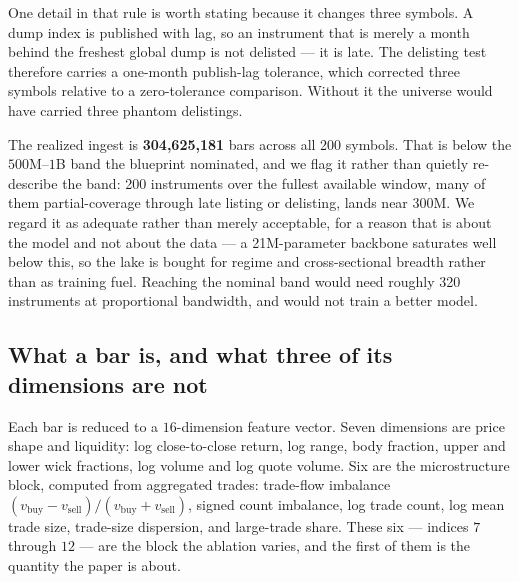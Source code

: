 One detail in that rule is worth stating because it changes three symbols. A dump index is published
with lag, so an instrument that is merely a month behind the freshest global dump is not delisted ---
it is late. The delisting test therefore carries a one-month publish-lag tolerance, which corrected
three symbols relative to a zero-tolerance comparison. Without it the universe would have carried
three phantom delistings.

The realized ingest is \textbf{304{,}625{,}181} bars across all 200 symbols. That is below the
$500$M--$1$B band the blueprint nominated, and we flag it rather than quietly re-describe the band:
200 instruments over the fullest available window, many of them partial-coverage through late
listing or delisting, lands near 300M. We regard it as adequate rather than merely acceptable, for
a reason that is about the model and not about the data --- a 21M-parameter backbone saturates
well below this, so the lake is bought for regime and cross-sectional breadth rather than as
training fuel. Reaching the nominal band would need roughly 320 instruments at proportional
bandwidth, and would not train a better model.

\subsection{What a bar is, and what three of its dimensions are not}
\label{sec:data-features}

Each bar is reduced to a $16$-dimension feature vector. Seven dimensions are price shape and
liquidity: log close-to-close return, log range, body fraction, upper and lower wick fractions, log
volume and log quote volume. Six are the microstructure block, computed from aggregated trades:
trade-flow imbalance $(v_{\text{buy}} - v_{\text{sell}})/(v_{\text{buy}} + v_{\text{sell}})$,
signed count imbalance, log trade count, log mean trade size, trade-size dispersion, and large-trade
share. These six --- indices $7$ through $12$ --- are the block the ablation varies, and the first
of them is the quantity the paper is about.

